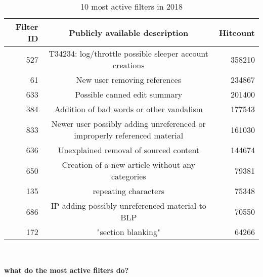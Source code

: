 \begin{table}
  \centering
  \begin{tabular}{r c r }
    Filter ID & Publicly available description & Hitcount \\
    \hline
    527 & T34234: log/throttle possible sleeper account creations & 358210 \\
    61 & New user removing references & 234867 \\
    633 & Possible canned edit summary & 201400 \\
    384 & Addition of bad words or other vandalism & 177543 \\
    833 & Newer user possibly adding unreferenced or improperly referenced material & 161030 \\
    636 & Unexplained removal of sourced content & 144674 \\
    650 & Creation of a new article without any categories & 79381 \\
    135 & repeating characters & 75348 \\
    686 & IP adding possibly unreferenced material to BLP & 70550 \\
    172 & "section blanking" & 64266 \\
  \end{tabular}
  \caption{10 most active filters in 2018}~\label{tab:most-active-2018}
\end{table}

\textbf{what do the most active filters do?}

